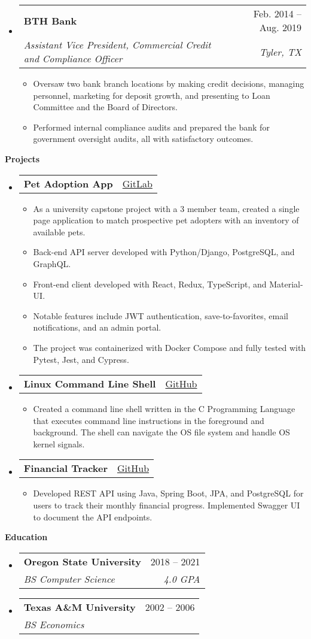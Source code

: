 \documentclass[letterpaper,12pt]{article}[leftmargin=*]
\makeatletter
\def \projectatext {GitLab}
\def \projectalink {https://gitlab.com/marc.clinedinst/osu-cs-467}
\def \projectbtext {GitHub}
\def \projectblink {https://github.com/robertjonesdev/CS344-Small-Linux-Shell}
\def \projectctext {GitHub}
\def \projectclink {https://github.com/robertjonesdev/FinancialTracker-SpringBoot}
\def \entryspacing {-0pt}
\def \projecta {\href{\projectalink}{\projectatext}}
\def \projectb {\href{\projectblink}{\projectbtext}}
\def \projectc {\href{\projectclink}{\projectctext}}
\renewcommand{\section}[2]{\vspace{5pt}
  \colorbox{secondary}{\color{white}\raggedbottom\normalsize\textbf{{#1}{\hspace{7pt}#2}}}
}
\newcommand{\resumeEntryStart}{\begin{itemize}[leftmargin=2.5mm]}
\newcommand{\resumeEntryEnd}{\end{itemize}\vspace{\entryspacing}}
\newcommand{\resumeItemListStart}{\begin{itemize}[leftmargin=4.5mm]}
\newcommand{\resumeItemListEnd}{\end{itemize}}
\newcommand{\resumeItem}[1]{
  \item\small{
    {#1 \vspace{-2pt}}
  }
}
\newcommand{\resumeEntryTSDL}[4]{
  \vspace{-1pt}\item[]
    \begin{tabularx}{0.97\textwidth}{X@{\hspace{60pt}}r}
      \textbf{\color{primary}#1} & {\firabook\color{accent}\small#2} \\
      \textit{\color{accent}\small#3} & \textit{\color{accent}\small#4} \\
    \end{tabularx}\vspace{-6pt}
}
\newcommand{\resumeEntryTD}[2]{
  \vspace{-1pt}\item[]
    \begin{tabularx}{0.97\textwidth}{X@{\hspace{60pt}}r}
      \textbf{\color{primary}#1} & {\firabook\color{accent}\small#2} \\
    \end{tabularx}\vspace{-6pt}
}
\makeatother
\begin{document}
  \resumeEntryStart
    \resumeEntryTSDL
      {BTH Bank}{Feb. 2014 -- Aug. 2019}
      {Assistant Vice President, Commercial Credit and Compliance Officer}{Tyler, TX}
    \resumeItemListStart
        \resumeItem {Oversaw two bank branch locations by making credit decisions, managing personnel, marketing for deposit growth, and presenting to Loan Committee and the Board of Directors.}
        \resumeItem {Performed internal compliance audits and prepared the bank for government oversight audits, all with satisfactory outcomes.}
    \resumeItemListEnd
  \resumeEntryEnd

\section{\faFlask}{Projects}

  \resumeEntryStart
    \resumeEntryTD
      {Pet Adoption App}{\projecta}
    \resumeItemListStart
      \resumeItem {As a university capstone project with a 3 member team, created a single page application to match prospective pet adopters with an inventory of available pets.}
      \resumeItem {Back-end API server developed with Python/Django, PostgreSQL, and GraphQL.}
      \resumeItem {Front-end client developed with React, Redux, TypeScript, and Material-UI.}
      \resumeItem {Notable features include JWT authentication, save-to-favorites, email notifications, and an admin portal.}
      \resumeItem {The project was containerized with Docker Compose and fully tested with Pytest, Jest, and Cypress.}
    \resumeItemListEnd
  \resumeEntryEnd

  \resumeEntryStart
    \resumeEntryTD
      {Linux Command Line Shell}{\projectb}
    \resumeItemListStart
      \resumeItem {Created a command line shell written in the C Programming Language that executes command line instructions in the foreground and background. The shell can navigate the OS file system and handle OS kernel signals.}
    \resumeItemListEnd
  \resumeEntryEnd

  \resumeEntryStart
    \resumeEntryTD
      {Financial Tracker}{\projectc}
    \resumeItemListStart
      \resumeItem {Developed REST API using Java, Spring Boot, JPA, and PostgreSQL for users to track their monthly financial progress. Implemented Swagger UI to document the API endpoints.}
    \resumeItemListEnd
  \resumeEntryEnd


\section{\faGraduationCap}{Education}

  \resumeEntryStart
    \resumeEntryTSDL
      {Oregon State University}{2018 -- 2021}
      {BS Computer Science}{4.0 GPA}
  \resumeEntryEnd

  \resumeEntryStart
    \resumeEntryTSDL
      {Texas A\&M University}{2002 -- 2006}
      {BS Economics}{ }
  \resumeEntryEnd
\end{document}
